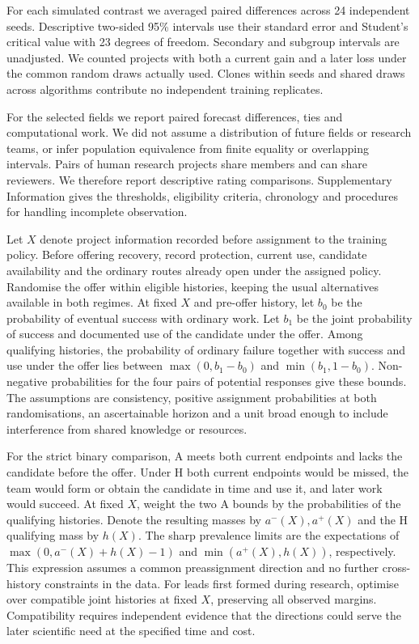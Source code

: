  For each simulated contrast we averaged paired differences across 24 independent seeds. Descriptive two-sided 95\% intervals use their standard error and Student's critical value with 23 degrees of freedom. Secondary and subgroup intervals are unadjusted. We counted projects with both a current gain and a later loss under the common random draws actually used. Clones within seeds and shared draws across algorithms contribute no independent training replicates.

For the selected fields we report paired forecast differences, ties and computational work. We did not assume a distribution of future fields or research teams, or infer population equivalence from finite equality or overlapping intervals. Pairs of human research projects share members and can share reviewers. We therefore report descriptive rating comparisons. Supplementary Information gives the thresholds, eligibility criteria, chronology and procedures for handling incomplete observation.

 Let \(X\) denote project information recorded before assignment to the training policy. Before offering recovery, record protection, current use, candidate availability and the ordinary routes already open under the assigned policy. Randomise the offer within eligible histories, keeping the usual alternatives available in both regimes. At fixed \(X\) and pre-offer history, let \(b_0\) be the probability of eventual success with ordinary work. Let \(b_1\) be the joint probability of success and documented use of the candidate under the offer. Among qualifying histories, the probability of ordinary failure together with success and use under the offer lies between \(\max(0,b_1-b_0)\) and \(\min(b_1,1-b_0)\). Non-negative probabilities for the four pairs of potential responses give these bounds. The assumptions are consistency, positive assignment probabilities at both randomisations, an ascertainable horizon and a unit broad enough to include interference from shared knowledge or resources.

For the strict binary comparison, A meets both current endpoints and lacks the candidate before the offer. Under H both current endpoints would be missed, the team would form or obtain the candidate in time and use it, and later work would succeed. At fixed \(X\), weight the two A bounds by the probabilities of the qualifying histories. Denote the resulting masses by \(a^-(X),a^+(X)\) and the H qualifying mass by \(h(X)\). The sharp prevalence limits are the expectations of \(\max(0,a^-(X)+h(X)-1)\) and \(\min(a^+(X),h(X))\), respectively. This expression assumes a common preassignment direction and no further cross-history constraints in the data. For leads first formed during research, optimise over compatible joint histories at fixed \(X\), preserving all observed margins. Compatibility requires independent evidence that the directions could serve the later scientific need at the specified time and cost.

